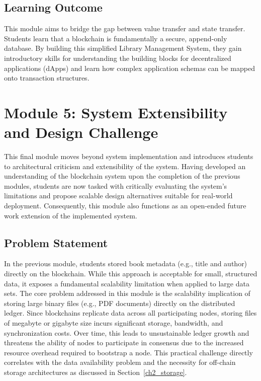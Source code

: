 \subsection{Learning Outcome}
This module aims to bridge the gap between value transfer and state transfer. Students learn that a blockchain is fundamentally a secure, append-only database. By building this simplified Library Management System, they gain introductory skills for understanding the building blocks for decentralized applications (dApps) and learn how complex application schemas can be mapped onto transaction structures.

\newpage

\section{Module 5: System Extensibility and Design Challenge} \label{ch5_module5}

This final module moves beyond system implementation and introduces students to architectural criticism and extensibility of the system. Having developed an understanding of the blockchain system upon the completion of the previous modules, students are now tasked with critically evaluating the system's limitations and propose scalable design alternatives suitable for real-world deployment. Consequently, this module also functions as an open-ended future work extension of the implemented system.

\subsection{Problem Statement}
In the previous module, students stored book metadata (e.g., title and author) directly on the blockchain. While this approach is acceptable for small, structured data, it exposes a fundamental scalability limitation when applied to large data sets. The core problem addressed in this module is the scalability implication of storing large binary files (e.g., PDF documents) directly on the distributed ledger. Since blockchains replicate data across all participating nodes, storing files of megabyte or gigabyte size incurs significant storage, bandwidth, and synchronization costs. Over time, this leads to unsustainable ledger growth and threatens the ability of nodes to participate in consensus due to the increased resource overhead required to bootstrap a node. This practical challenge directly correlates with the data availability problem and the necessity for off-chain storage architectures as discussed in Section~\ref{ch2_storage}.


